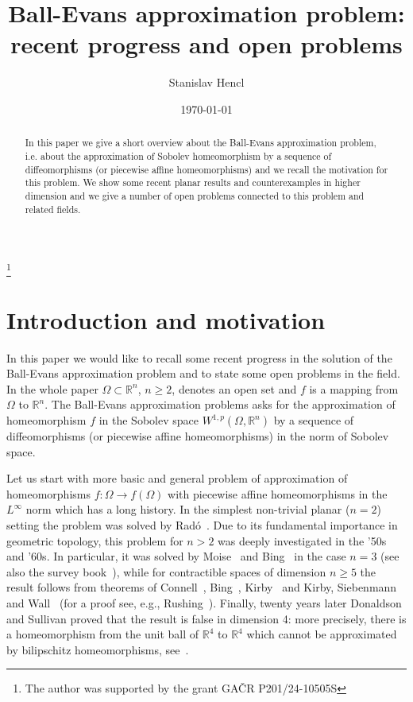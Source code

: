 \documentclass[12pt,a4paper]{amsart}
\title{Ball-Evans approximation problem: recent progress and open problems}
\author{Stanislav Hencl}
\date{\today}
\theoremstyle{plain}
\theoremstyle{definition}
\numberwithin{equation}{section}
\def\er{\mathbb R}
\def\rn{\mathbb R^n}
\newcounter{problem}
\begin{document}
\setcounter{problem}{0}
\def\open#1{\vskip 5pt\addtocounter{problem}{1} {\bf Open problem \theproblem.} {\underline{#1}}:}

\thanks{The author was supported by the grant GA\v{C}R P201/24-10505S}


\begin{abstract}
    {In this paper we give a short overview about the Ball-Evans approximation problem, i.e. about the approximation of Sobolev homeomorphism by a sequence of diffeomorphisms (or piecewise affine homeomorphisms) and we recall the motivation for this problem. We show some recent planar results and counterexamples in higher dimension and we give a number of open problems connected to this problem and related fields.}
\end{abstract}

\maketitle

\section{Introduction and motivation}

In this paper we would like to recall some recent progress in the solution of the Ball-Evans approximation problem and to state some open problems in the field. 
In the whole paper $\Omega\subset\rn$, $n\geq 2$, denotes an open set and $f$ is a mapping from $\Omega$ to $\rn$. The Ball-Evans approximation problems asks for the approximation of homeomorphism $f$ in the Sobolev space $W^{1,p}(\Omega,\rn)$ by a sequence of diffeomorphisms (or piecewise affine homeomorphisms) in the norm of Sobolev space. 

Let us start with more basic and general problem of approximation of homeomorphisms $f:\Omega\to f(\Omega)$ with piecewise affine homeomorphisms in the $L^{\infty}$ norm which has a long history. In the simplest non-trivial planar ($n=2$) setting the problem was solved by Rad\'{o}~\cite{Rado}. Due to its fundamental importance in geometric topology, this problem for $n>2$ was deeply investigated in the '50s and '60s. In particular, it was solved by Moise~\cite{Moise1} and Bing~\cite{Bing} in the case $n=3$ (see also the survey book~\cite{Moise2}), while for contractible spaces of dimension $n\geq5$ the result follows from theorems of Connell~\cite{Conn}, Bing~\cite{Bing2}, Kirby~\cite{Kirby} and Kirby, Siebenmann and Wall~\cite{Kirbetal} (for a proof see, e.g., Rushing~\cite{Rush}). Finally, twenty years later Donaldson and Sullivan proved that the result is false in dimension 4: more precisely, there is a homeomorphism from the unit ball of $\er^4$ to $\er^4$ which cannot be approximated by bilipschitz homeomorphisms, see~\cite[Corollary, page~183]{DonSull}.\par
\end{document}
